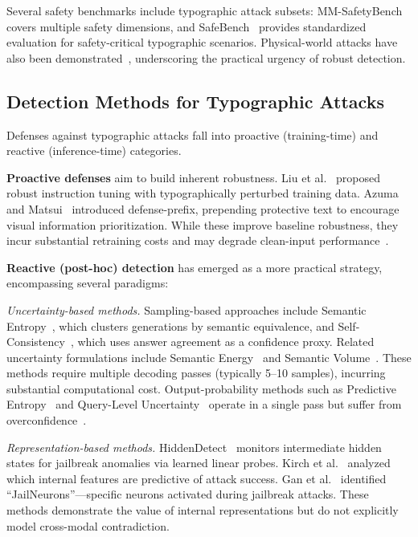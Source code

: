 \documentclass[preprint,12pt]{elsarticle}
\begin{document}
Several safety benchmarks include typographic attack subsets: MM-SafetyBench~\cite{liu2024mm} covers multiple safety dimensions, and SafeBench~\cite{gong2025figstep} provides standardized evaluation for safety-critical typographic scenarios. Physical-world attacks have also been demonstrated~\cite{ling2026physical}, underscoring the practical urgency of robust detection.

\subsection{Detection Methods for Typographic Attacks}

Defenses against typographic attacks fall into proactive (training-time) and reactive (inference-time) categories.

\textbf{Proactive defenses} aim to build inherent robustness. Liu et al.~\cite{liu2023mitigating} proposed robust instruction tuning with typographically perturbed training data. Azuma and Matsui~\cite{azuma2023defense} introduced defense-prefix, prepending protective text to encourage visual information prioritization. While these improve baseline robustness, they incur substantial retraining costs and may degrade clean-input performance~\cite{bengio2025international}.

\textbf{Reactive (post-hoc) detection} has emerged as a more practical strategy, encompassing several paradigms:

\textit{Uncertainty-based methods.} Sampling-based approaches include Semantic Entropy~\cite{farquhar2024detecting}, which clusters generations by semantic equivalence, and Self-Consistency~\cite{wang2022self}, which uses answer agreement as a confidence proxy. Related uncertainty formulations include Semantic Energy~\cite{ma2025semantic} and Semantic Volume~\cite{li2026semantic}. These methods require multiple decoding passes (typically 5--10 samples), incurring substantial computational cost. Output-probability methods such as Predictive Entropy~\cite{kadavath2022language,malinin2020uncertainty} and Query-Level Uncertainty~\cite{chen2025query} operate in a single pass but suffer from overconfidence~\cite{guo2017calibration,tian2023just}.

\textit{Representation-based methods.} HiddenDetect~\cite{jiang2025hiddendetect} monitors intermediate hidden states for jailbreak anomalies via learned linear probes. Kirch et al.~\cite{kirch2025features} analyzed which internal features are predictive of attack success. Gan et al.~\cite{gansure} identified ``JailNeurons''---specific neurons activated during jailbreak attacks. These methods demonstrate the value of internal representations but do not explicitly model cross-modal contradiction.
\end{document}
